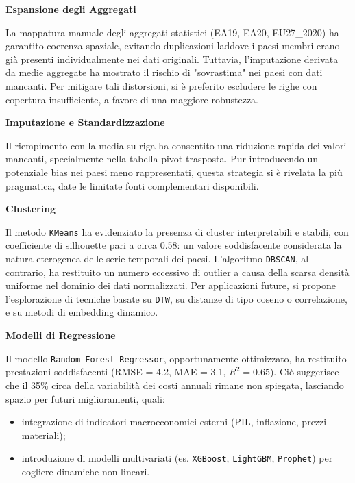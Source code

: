 \documentclass[conference]{IEEEtran}
\begin{document}
\begin{itemize}
{\noindent\textbf{Espansione degli Aggregati}

La mappatura manuale degli aggregati statistici (EA19, EA20, EU27\_2020) ha garantito coerenza spaziale, evitando duplicazioni laddove i paesi membri erano già presenti individualmente nei dati originali. Tuttavia, l’imputazione derivata da medie aggregate ha mostrato il rischio di "sovrastima" nei paesi con dati mancanti. Per mitigare tali distorsioni, si è preferito escludere le righe con copertura insufficiente, a favore di una maggiore robustezza.

\noindent\textbf{Imputazione e Standardizzazione}

Il riempimento con la media su riga ha consentito una riduzione rapida dei valori mancanti, specialmente nella tabella pivot trasposta. Pur introducendo un potenziale bias nei paesi meno rappresentati, questa strategia si è rivelata la più pragmatica, date le limitate fonti complementari disponibili.

\noindent\textbf{Clustering}

Il metodo \texttt{KMeans} ha evidenziato la presenza di cluster interpretabili e stabili, con coefficiente di silhouette pari a circa 0.58: un valore soddisfacente considerata la natura eterogenea delle serie temporali dei paesi. L’algoritmo \texttt{DBSCAN}, al contrario, ha restituito un numero eccessivo di outlier a causa della scarsa densità uniforme nel dominio dei dati normalizzati. Per applicazioni future, si propone l’esplorazione di tecniche basate su \texttt{DTW}, su distanze di tipo coseno o correlazione, e su metodi di embedding dinamico.



\noindent\textbf{Modelli di Regressione}

Il modello \texttt{Random Forest Regressor}, opportunamente ottimizzato, ha restituito prestazioni soddisfacenti (RMSE = 4.2, MAE = 3.1, $R^2 = 0.65$). Ciò suggerisce che il 35\% circa della variabilità dei costi annuali rimane non spiegata, lasciando spazio per futuri miglioramenti, quali:

\begin{itemize} \item integrazione di indicatori macroeconomici esterni (PIL, inflazione, prezzi materiali); \item introduzione di modelli multivariati (es. \texttt{XGBoost}, \texttt{LightGBM}, \texttt{Prophet}) per cogliere dinamiche non lineari. \end{itemize}

}
\end{itemize}
\end{document}
